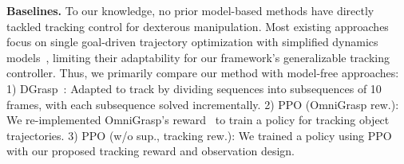 \vspace{-5pt}
\noindent\textbf{Baselines.} 
To our knowledge, no prior model-based methods have directly tackled tracking control for dexterous manipulation. Most existing approaches focus on single goal-driven trajectory optimization with simplified dynamics models~\citep{Jin2024ComplementarityFreeMM,pang2023global,pang2021convex}, limiting their adaptability for our framework's generalizable tracking controller. Thus, we primarily compare our method with model-free approaches: 1) DGrasp~\citep{christen2022d}: Adapted to track by dividing sequences into subsequences of 10 frames, with each subsequence solved incrementally. 2) PPO (OmniGrasp rew.): We re-implemented OmniGrasp's reward~\citep{Luo2024GraspingDO} to train a policy for tracking object trajectories. 3) PPO (w/o sup., tracking rew.): We trained a policy using PPO with our proposed tracking reward and observation design.

